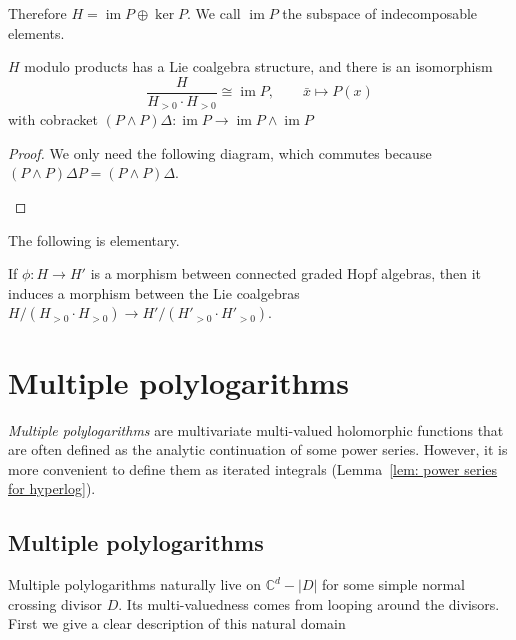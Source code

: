 Therefore $H=\operatorname{im}P\oplus\ker P$. We call $\operatorname{im}P$ the subspace of indecomposable elements.

\begin{theorem}\label{thm: H modulo products is Lie coalgebra}
$H $ modulo products has a Lie coalgebra structure, and there is an isomorphism
\[
\dfrac{H}{H_{>0}\cdot H_{>0}}\cong\operatorname{im}P,\qquad\bar x\mapsto P(x)
\]
with cobracket $(P\wedge P)\Delta:\operatorname{im}P\to \operatorname{im}P\wedge\operatorname{im}P$
\end{theorem}

\begin{proof}
We only need the following diagram, which commutes because $(P\wedge P)\Delta P=(P\wedge P)\Delta$.
\begin{center}
\end{center}
\end{proof}

The following is elementary.

\begin{proposition}\label{prop: Hopf algebra morphism induce Lie coalgebra morphism}
If $\phi:H\to H'$ is a morphism between connected graded Hopf algebras, then it induces a morphism between the Lie coalgebras $H/(H_{>0}\cdot H_{>0})\to H'/(H'_{>0}\cdot H'_{>0})$.
\end{proposition}

\section{Multiple polylogarithms}

\textit{Multiple polylogarithms} are multivariate multi-valued holomorphic functions that are often defined as the analytic continuation of some power series. However, it is more convenient to define them as iterated integrals (Lemma~\ref{lem: power series for hyperlog}).

\subsection{Multiple polylogarithms}

Multiple polylogarithms naturally live on $\mathbb C^d-|D|$ for some simple normal crossing divisor $D$. Its multi-valuedness comes from looping around the divisors. First we give a clear description of this natural domain


